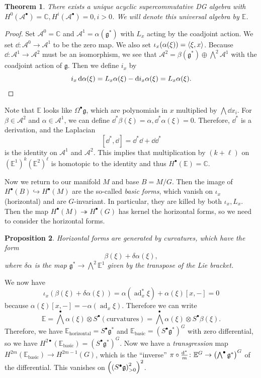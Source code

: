 \documentclass[leqno, openany]{memoir}
\newtheorem{thm}{Theorem}[section]
\newtheorem{prop}[thm]{Proposition}
\theoremstyle{definition}
\theoremstyle{remark}
\theoremstyle{plain}
\theoremstyle{definition}
\theoremstyle{remark}
\newcommand{\C}{\mathbb{C}}
\newcommand{\E}{\mathbb{E}}
\newcommand{\mf}[1]{\mathfrak{#1}}
\newcommand{\msc}[1]{\mathscr{#1}}
\DeclareMathOperator{\ad}{ad}
\begin{document}
\begin{thm}
    There exists a unique acyclic supercommutative DG algebra with $H^0(\msc{A}^{\bullet}) = \C, H^i(\msc{A}^{\bullet}) = 0, i > 0$. We will denote this universal algebra by $\mathbb{E}$.
\end{thm}

\begin{proof}
    Set $\msc{A}^0 = \C$ and $\msc{A}^1 = \alpha(\mf{g}^*)$ with $L_x$ acting by the coadjoint action. We set $\dd \colon \msc{A}^0 \to \msc{A}^1$ to be the zero map. We also set $\iota_x(\alpha(\xi)) = \ev{\xi, x}$. Because $\dd \colon \msc{A}^1 \to \msc{A}^2$ must be an isomorphism, we see that $\msc{A}^2 = \beta(\mf{g}^*) \oplus \bigwedge^2 \msc{A}^1$ with the coadjoint action of $\mf{g}$. Then we define $i_x$ by
    \[ i_x \dd{\alpha(\xi)} = L_x \alpha(\xi) - \dd i_x \alpha(\xi) = L_x \alpha(\xi). \qedhere \]
\end{proof}

Note that $\E$ looks like $\Omega^{\bullet} \mf{g}$, which are polynomials in $x$ multiplied by $\bigwedge \dd{x_i}$. For $\beta \in \msc{A}^2$ and $\alpha \in \msc{A}^1$, we can define $\dd^*{\beta}(\xi) = \alpha, \dd^* \alpha(\xi) = 0$. Therefore, $\dd^*$ is a derivation, and the Laplacian
\[ [\dd^*, \dd] = \dd^* \dd + \dd \dd^* \]
is the identity on $\msc{A}^1$ and $\msc{A}^2$. This implies that multiplication by $(k+\ell)$ on ${(\E^1)}^k {(\E^2)}^{\ell}$ is homotopic to the identity and thus $H^{\bullet}(\E) = \C$.

Now we return to our manifold $M$ and base $B = M/G$. Then the image of $H^{\bullet}(B) \hookrightarrow H^{\bullet}(M)$ are the so-called \textit{basic forms}, which vanish on $\iota_x$ (horizontal) and are $G$-invariant. In particular, they are killed by both $\iota_x, L_x$. Then the map $H^{\bullet}(M) \twoheadrightarrow H^{\bullet}(G)$ has kernel the horizontal forms, so we need to consider the horizontal forms.

\begin{prop}
    Horizontal forms are generated by \textit{curvatures}, which have the form 
    \[ \beta(\xi) + \delta \alpha(\xi), \]
    where $\delta \alpha$ is the map $\mf{g}^* \to \bigwedge^2 \E^1$ given by the transpose of the Lie bracket. 
\end{prop}

We now have
\[ \iota_x (\beta(\xi) + \delta \alpha(\xi)) = \alpha(\ad_x^* \xi) + \alpha(\xi) [x,-] = 0 \]
because $\alpha(\xi)[x,-] = -\alpha(\ad_x \xi)$. Therefore we can write
\[ \E = {\bigwedge}^{\bullet} \alpha(\xi) \otimes S^{\bullet}(\text{curvatures}) = {\bigwedge}^{\bullet} \alpha(\xi) \otimes S^{\bullet} \beta(\xi). \]
Therefore, we have $\E_{\text{horizontal}} = S^{\bullet} \mf{g}^*$ and $\E_{\text{basic}} = {(S^{\bullet} \mf{g}^*)}^G$ with zero differential, so we have $H^{2 \bullet}(\E_{\text{basic}}) = {(S^{\bullet} \mf{g}^*)}^G$. Now we have a \textit{transgression} map $H^{2 m}(\E_{\text{basic}}) \to H^{2 m-1}(G)$, which is the ``inverse'' $\pi \circ \frac{\dd^*}{m} \colon \E^G \to { \qty( \bigwedge^{\bullet} \mf{g}^* ) }^G$ of the differential. This vanishes on ${ \qty( { ( S^{\bullet} \mf{g} ) }^2_{>0} ) }^2$.
\end{document}
